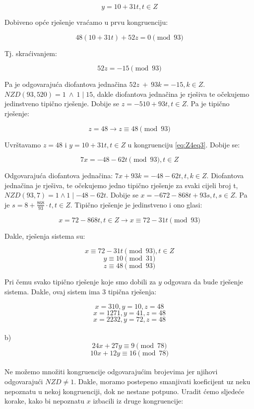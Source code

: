 \documentclass[12pt]{article}
\begin{document}
$$y = 10 + 31t, t \in Z$$\vspace{1mm}

Dobiveno opće rješenje vraćamo u prvu kongruenciju:

$$48(10 + 31t) + 52z = 0 \pmod {93}$$\vspace{1mm}

Tj. skraćivanjem:

$$52z = -15 \pmod{93}$$\vspace{1mm}

Pa je odgovarajuća diofantova jednačina $52z\> +\> 93k = -15, k \in Z$. $NZD(93, 520) = 1 \> \land \> 1 \mid 15$, dakle diofantova jednačina je rješiva te očekujemo jedinstveno tipično rješenje. Dobije se $z = -510 + 93t, t \in Z$. Pa je tipično rješenje:

$$z = 48 \to z \equiv 48 \pmod{93}$$\vspace{1mm}

Uvrštavamo $z = 48$ i $y = 10 + 31t, t \in Z$ u kongruenciju \ref{eq:Z4eq3}. Dobije se:

$$7x = -48 - 62t \pmod{93}, t \in Z$$\vspace{1mm}

Odgovarajuća diofantova jednačina: $7x + 93k = -48 - 62t, t, k \in Z$. Diofantova jednačina je rješiva, te očekujemo jedno tipično rješenje za svaki cijeli broj t, $NZD(93, 7) = 1 \land 1 \mid -48 - 62t$.
Dobije se $x = -672 -868t + 93s, t, s \in Z$. Pa je $s = 8 + \frac{868}{93} \cdot t, t \in Z$. Tipično rješenje je jedinstveno i ono glasi:

$$x = 72 - 868t, t \in Z \to x \equiv 72 - 31t \pmod{93}$$\vspace{1mm}

Dakle, rješenja sistema su:

$$x \equiv 72 - 31t \pmod{93}, t \in Z$$
$$y \equiv 10 \pmod{31}$$
$$z \equiv 48 \pmod{93}$$\vspace{1mm}

Pri čemu svako tipično rješenje koje smo dobili za $y$ odgovara da bude rješenje sistema. Dakle, ovaj sistem ima 3 tipična rješenja:

$$x = 310, y = 10, z = 48$$ 
$$x = 1271, y = 41, z = 48$$
$$x = 2232, y = 72, z = 48$$\vspace{1mm}
\\
b)
\[
24x + 27y \equiv 9 \pmod{78} \label{eq:Z4eq1b} \tag{1}
\]
\[
10x + 12y \equiv 16 \pmod{78} \label{eq:Z4eq2b} \tag{2}
\]
\\

Ne možemo množiti kongruencije odgovarajućim brojevima jer njihovi odgovarajući $NZD \neq 1$. Dakle, moramo postepeno smanjivati koeficijent uz neku nepoznatu u nekoj kongruenciji, dok ne nestane potpuno. Uradit ćemo sljedeće korake, kako bi nepoznatu $x$ izbacili iz druge kongruencije:\vspace{1mm}
\end{document}
